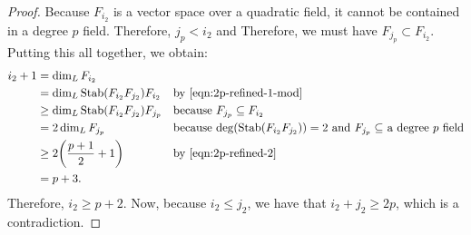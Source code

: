 \documentclass[letterpaper,10pt]{amsart}
\DeclareMathOperator{\Stab}{Stab}
\theoremstyle{definition}
\theoremstyle{remark}
\begin{document}
\begin{proof}
Because $F_{i_2}$ is a vector space over a quadratic field, it cannot be contained in a degree $p$ field. Therefore, $j_p < i_2$ and Therefore, we must have $F_{j_p}  \subset F_{i_2}$. Putting this all together, we obtain:
\begin{align*}
i_2 + 1 &= \dim_L F_{i_2} && \\
&= \dim_L \Stab(F_{i_2}F_{j_2})F_{i_2} && \text{by \Cref{eqn:2p-refined-1-mod}} \\
&\geq \dim_L \Stab(F_{i_2}F_{j_2})F_{j_p} && \text{because  $F_{j_p}  \subseteq F_{i_2}$ } \\
&= 2\dim_{L}F_{j_p} && \text{because $\deg(\Stab(F_{i_2}F_{j_2})) = 2$ and $F_{j_p} \subseteq$ a degree $p$ field}\\
&\geq 2\bigg(\frac{p+1}{2} + 1\bigg)  && \text{by \Cref{eqn:2p-refined-2}}\\
&= p+3. &&
\end{align*}
Therefore, $i_2 \geq p+2$. Now, because $i_2 \leq j_2$, we have that $i_2 + j_2 \geq 2p$, which is a contradiction.
\end{proof}
\end{document}
